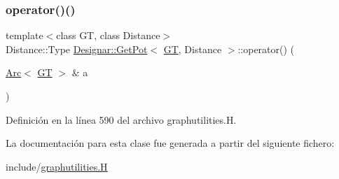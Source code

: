 \subsubsection{\texorpdfstring{operator()()}{operator()()}}
{\footnotesize\ttfamily template$<$class GT, class Distance$>$ \\
Distance\+::\+Type \hyperlink{class_designar_1_1_get_pot}{Designar\+::\+Get\+Pot}$<$ \hyperlink{demo-buildgraph_8_c_a3001c40d2c31ca87ed96cd7d1334a55e}{GT}, Distance $>$\+::operator() (\begin{DoxyParamCaption}\item[{\hyperlink{namespace_designar_a3f55fb5513d62ff47cbc8f72b8e95d6f}{Arc}$<$ \hyperlink{demo-buildgraph_8_c_a3001c40d2c31ca87ed96cd7d1334a55e}{GT} $>$ \&}]{a }\end{DoxyParamCaption})\hspace{0.3cm}{\ttfamily [inline]}}



Definición en la línea 590 del archivo graphutilities.\+H.



La documentación para esta clase fue generada a partir del siguiente fichero\+:\begin{DoxyCompactItemize}
\item 
include/\hyperlink{graphutilities_8_h}{graphutilities.\+H}\end{DoxyCompactItemize}
